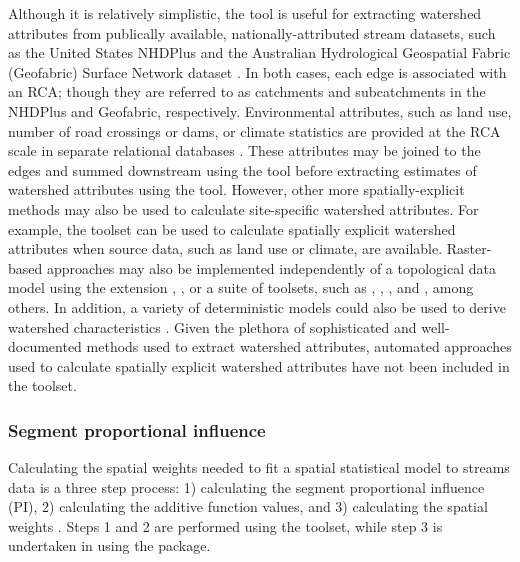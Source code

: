 \documentclass[article]{jss}
\begin{document}
Although it is relatively simplistic, the 
tool is useful for extracting watershed attributes from publically
available, nationally-attributed stream datasets, such as the United
States NHDPlus \citep{HSC:nati:2007} and
the Australian Hydrological Geospatial Fabric (Geofabric) Surface Network dataset \citep{BOM:aust:2012}. In
both cases, each edge is associated with an RCA; though they are
referred to as catchments and subcatchments in the NHDPlus and
Geofabric, respectively. Environmental attributes, such as land use,
number of road crossings or dams, or climate statistics are provided
at the RCA scale in separate relational databases \citep{Stei:Hutc:Stei:nati:2012, USGS:attr:2010}. These attributes
may be joined to the edges and summed downstream using the 
 tool before extracting estimates of
watershed attributes using the 
tool. However, other more spatially-explicit methods may also be used
to calculate site-specific watershed attributes. For example, the
  toolset can be used to calculate
spatially explicit watershed attributes when source data, such as land
use or climate, are available. Raster-based approaches may also be implemented independently
of a topological data model using the
  extension \citep{ESRI:ArcG:2009},
 \citep{McGa:Cush:Ene:FRAG:2012}, or a suite of
 toolsets, such as
 \citep{Jasi:Metz:new:2011}, , , and
 \citep{Nete:Mita:open:2008}, among others. In addition, a variety of
deterministic models could also be used to derive watershed
characteristics \citep[e.g.,][]{Rath:Wohl:one:2001}. Given the plethora of
sophisticated and well-documented methods used to extract watershed attributes, automated approaches used to calculate spatially explicit watershed attributes have not been included in the  toolset.


\subsubsection{Segment proportional influence}

Calculating the spatial weights needed to fit a spatial statistical model to streams data is a three step process: 1) calculating the segment proportional influence (PI), 2) calculating the additive function values, and 3) calculating the spatial weights \citep{Pete:Ver:mixe:2010}. Steps 1 and 2 are performed using the  toolset, while step 3 is undertaken in  using the  package.
\end{document}
